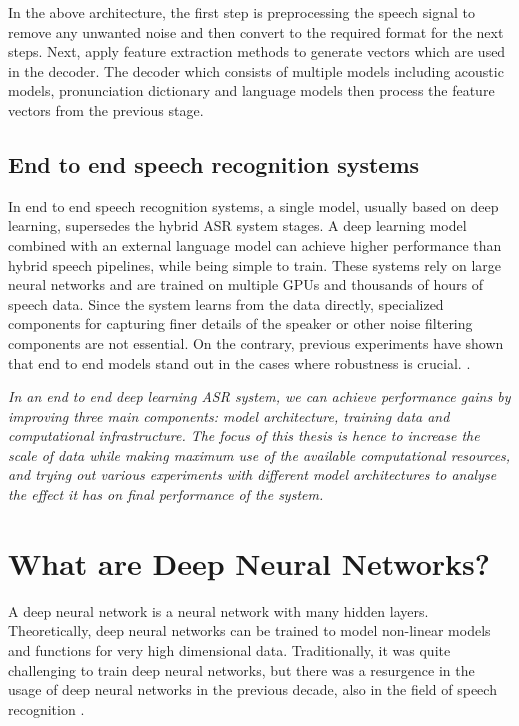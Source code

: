 In the above architecture, the first step is preprocessing the speech signal to remove any unwanted noise and then convert to the required format for the next steps. Next, apply feature extraction methods to generate vectors which are used in the decoder. The decoder which consists of multiple models including acoustic models, pronunciation dictionary and language models then process the feature vectors from the previous stage.

\subsection{End to end speech recognition systems}
\label{section:e2easr}
In end to end speech recognition systems, a single model, usually based on deep learning, supersedes the hybrid ASR system stages. A deep learning model combined with an external language model can achieve higher performance than hybrid speech pipelines, while being simple to train. These systems rely on large neural networks and are trained on multiple GPUs and thousands of hours of speech data. Since the system learns from the data directly, specialized components for capturing finer details of the speaker or other noise filtering components are not essential. On the contrary, previous experiments have shown that end to end models stand out in the cases where robustness is crucial. \cite{Hannun2014DeepRecognition}. 

\emph{In an end to end deep learning ASR system, we can achieve performance gains by improving three main components: model architecture, training data and computational infrastructure. The focus of this thesis is hence to increase the scale of data while making maximum use of the available computational resources, and trying out various experiments with different model architectures to analyse the effect it has on final performance of the system.}

\section{What are Deep Neural Networks?}
A deep neural network is a neural network with many hidden layers. Theoretically, deep neural networks can be trained to model non-linear models and functions for very high dimensional data. Traditionally, it was quite challenging to train deep neural networks, but there was a resurgence in the usage of deep neural networks in the previous decade, also in the field of speech recognition \cite{Dahl2012Context-DependentRecognition, Morgan2012DeepRecognition, DengRECENTMICROSOFT, Hannun2014DeepRecognition}. 

